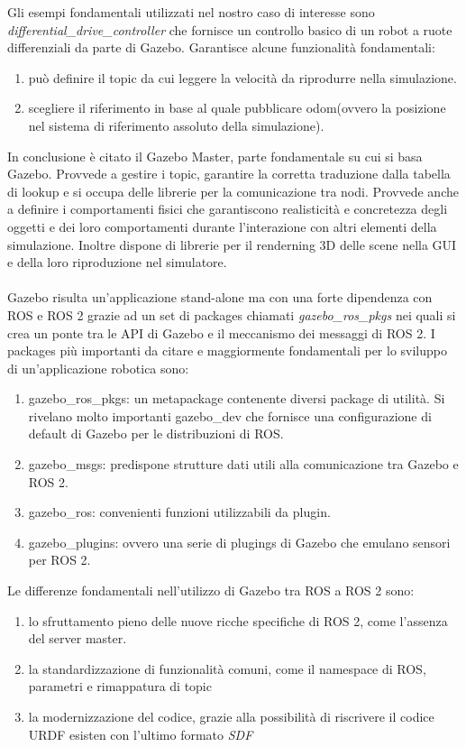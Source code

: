 \documentclass[a4paper,11 pt,oneside]{book}
\theoremstyle{definition}
\begin{document}
Gli esempi fondamentali utilizzati nel nostro caso di interesse sono \emph{differential_drive_controller} che fornisce un controllo basico di un robot a ruote differenziali da parte di Gazebo.
Garantisce alcune funzionalità fondamentali:
\begin{enumerate}
\item può definire il topic da cui leggere la velocità da riprodurre nella simulazione.
\item  scegliere il riferimento in base al quale pubblicare odom(ovvero la posizione nel sistema di riferimento assoluto della simulazione).
\end{enumerate}
In conclusione è citato il Gazebo Master, parte fondamentale su cui si basa Gazebo.
Provvede a gestire i topic, garantire la corretta traduzione dalla tabella di lookup e si occupa delle librerie per la comunicazione tra nodi.
Provvede anche a definire i comportamenti fisici che garantiscono realisticità e concretezza degli oggetti e dei loro comportamenti durante l'interazione con altri elementi della simulazione. Inoltre dispone di librerie per il renderning 3D delle scene nella GUI e della loro riproduzione nel simulatore.
\\
\\
Gazebo risulta un'applicazione stand-alone ma con una forte dipendenza con ROS e ROS 2 grazie ad un set di packages chiamati \emph{gazebo_ros_pkgs} nei quali si crea un ponte tra le API di Gazebo e il meccanismo dei messaggi di ROS 2.
I packages più importanti da citare e maggiormente fondamentali per lo sviluppo di un'applicazione robotica sono:
\begin{enumerate}
\item gazebo_ros_pkgs: un metapackage contenente diversi package di utilità.
Si rivelano molto importanti gazebo_dev che fornisce una configurazione di default di Gazebo per le distribuzioni di ROS.
\item gazebo_msgs: predispone strutture dati utili alla comunicazione tra Gazebo e ROS 2.
\item gazebo_ros:  convenienti funzioni utilizzabili da plugin.
\item gazebo_plugins: ovvero una serie di plugings di Gazebo che emulano sensori per ROS 2.
\end{enumerate}

Le differenze fondamentali nell'utilizzo di Gazebo tra ROS a ROS 2 sono:
\begin{enumerate}
\item lo sfruttamento pieno delle nuove ricche specifiche di ROS 2, come l'assenza del server master.
\item la standardizzazione di funzionalità comuni, come il namespace di ROS, parametri e rimappatura di topic
\item la modernizzazione del codice, grazie alla possibilità di riscrivere il codice URDF esisten con l'ultimo formato \emph{SDF}
\end{enumerate}
\end{document}
